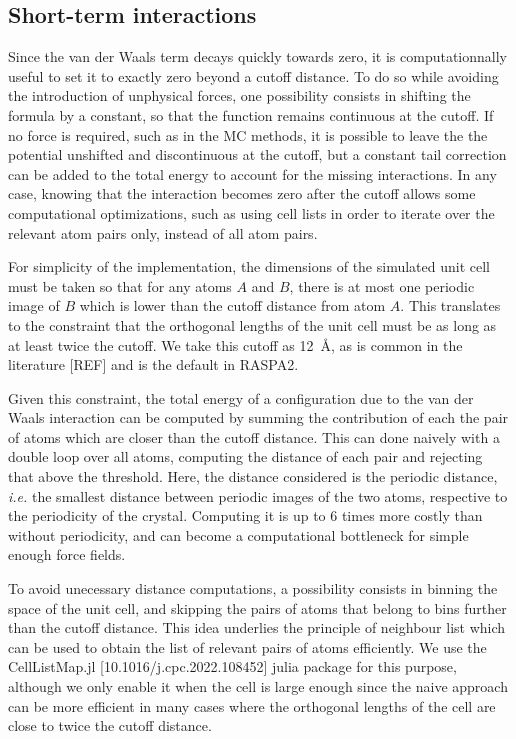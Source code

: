 \documentclass[main.tex]{subfiles}
\begin{document}
\subsection{Short-term interactions}

Since the van der Waals term decays quickly towards zero, it is computationnally useful to set it to exactly zero beyond a cutoff distance. To do so while avoiding the introduction of unphysical forces, one possibility consists in shifting the formula by a constant, so that the function remains continuous at the cutoff. If no force is required, such as in the MC methods, it is possible to leave the the potential unshifted and discontinuous at the cutoff, but a constant tail correction can be added to the total energy to account for the missing interactions. In any case, knowing that the interaction becomes zero after the cutoff allows some computational optimizations, such as using cell lists in order to iterate over the relevant atom pairs only, instead of all atom pairs.

For simplicity of the implementation, the dimensions of the simulated unit cell must be taken so that for any atoms $A$ and $B$, there is at most one periodic image of $B$ which is lower than the cutoff distance from atom $A$. This translates to the constraint that the orthogonal lengths of the unit cell must be as long as at least twice the cutoff. We take this cutoff as \qty{12}{\angstrom}, as is common in the literature [REF] and is the default in RASPA2.

Given this constraint, the total energy of a configuration due to the van der Waals interaction can be computed by summing the contribution of each the pair of atoms which are closer than the cutoff distance. This can done naively with a double loop over all atoms, computing the distance of each pair and rejecting that above the threshold. Here, the distance considered is the periodic distance, \textit{i.e.} the smallest distance between periodic images of the two atoms, respective to the periodicity of the crystal. Computing it is up to 6 times more costly than without periodicity, and can become a computational bottleneck for simple enough force fields.

To avoid unecessary distance computations, a possibility consists in binning the space of the unit cell, and skipping the pairs of atoms that belong to bins further than the cutoff distance. This idea underlies the principle of neighbour list which can be used to obtain the list of relevant pairs of atoms efficiently. We use the CellListMap.jl [10.1016/j.cpc.2022.108452] julia package for this purpose, although we only enable it when the cell is large enough since the naive approach can be more efficient in many cases where the orthogonal lengths of the cell are close to twice the cutoff distance.
\end{document}

